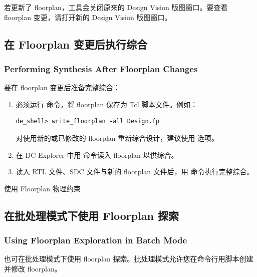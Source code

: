 
若更新了 floorplan，工具会关闭原来的 Design Vision 版图窗口。要查看 floorplan 变更，请打开新的 Design Vision 版图窗口。

\subsection{在 Floorplan 变更后执行综合}
\subsubsection*{Performing Synthesis After Floorplan Changes}

要在 floorplan 变更后准备完整综合：
\begin{enumerate}
  \item 必须运行  命令，将 floorplan 保存为 Tcl 脚本文件。例如：
\begin{lstlisting}
de_shell> write_floorplan -all Design.fp
\end{lstlisting}
        对使用新的或已修改的 floorplan 重新综合设计，建议使用  选项。
  \item 在 DC Explorer 中用  命令读入 floorplan 以供综合。
  \item 读入 RTL 文件、SDC 文件与新的 floorplan 文件后，用  命令执行完整综合。
\end{enumerate}

\begin{seeAlsoBox}
使用 Floorplan 物理约束
\end{seeAlsoBox}

\subsection{在批处理模式下使用 Floorplan 探索}
\subsubsection*{Using Floorplan Exploration in Batch Mode}

也可在批处理模式下使用 floorplan 探索。批处理模式允许您在命令行用脚本创建并修改 floorplan。

